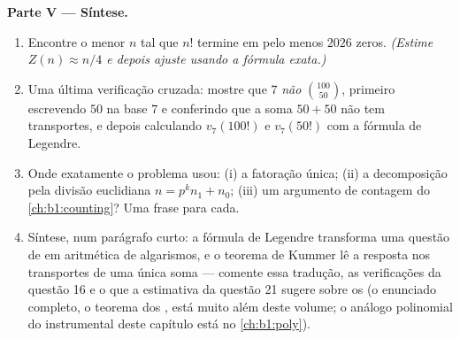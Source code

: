 \begin{problem}
\medskip
\noindent\textbf{Parte V --- Síntese.}
\begin{enumerate}
  \item Encontre o menor $n$ tal que $n!$ termine em pelo menos
        $2026$ zeros. \emph{(Estime $Z(n) \approx n/4$ e depois
        ajuste usando a fórmula exata.)}
  \item Uma última verificação cruzada: mostre que $7$ \emph{não} 
        $\binom{100}{50}$, primeiro escrevendo $50$ na base $7$ e
        conferindo que a soma $50 + 50$ não tem transportes, e depois
        calculando $v_7(100!)$ e $v_7(50!)$ com a fórmula de
        Legendre.
  \item Onde exatamente o problema usou: (i) a fatoração
        única; (ii) a decomposição pela divisão euclidiana
        $n = p^k n_1 + n_0$; (iii) um argumento de contagem do
        \cref{ch:b1:counting}? Uma frase para cada.
  \item Síntese, num parágrafo curto: a fórmula de Legendre transforma
        uma questão de  em aritmética de algarismos, e
        o teorema de Kummer lê a resposta nos transportes de uma única
        soma --- comente essa tradução, as verificações da
        questão 16 e o que a estimativa da questão 21 sugere
        sobre os  (o enunciado completo, o teorema dos , está muito além deste volume; o análogo polinomial
        do instrumental deste capítulo está no
        \cref{ch:b1:poly}).
\end{enumerate}
\end{problem}
